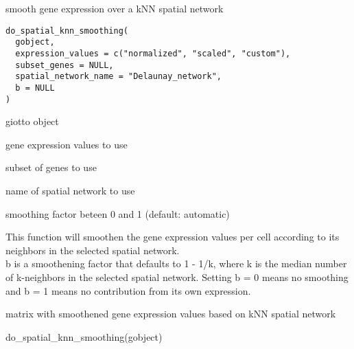 \documentclass[a4paper]{book}
\begin{document}
%
\begin{Description}\relax
smooth gene expression over a kNN spatial network
\end{Description}
%
\begin{Usage}
\begin{verbatim}
do_spatial_knn_smoothing(
  gobject,
  expression_values = c("normalized", "scaled", "custom"),
  subset_genes = NULL,
  spatial_network_name = "Delaunay_network",
  b = NULL
)
\end{verbatim}
\end{Usage}
%
\begin{Arguments}
\begin{ldescription}
\item[\code{gobject}] giotto object

\item[\code{expression\_values}] gene expression values to use

\item[\code{subset\_genes}] subset of genes to use

\item[\code{spatial\_network\_name}] name of spatial network to use

\item[\code{b}] smoothing factor beteen 0 and 1 (default: automatic)
\end{ldescription}
\end{Arguments}
%
\begin{Details}\relax
This function will smoothen the gene expression values per cell according to
its neighbors in the selected spatial network. \\{}
b is a smoothening factor that defaults to 1 - 1/k, where k is the median number of
k-neighbors in the selected spatial network. Setting b = 0 means no smoothing and b = 1
means no contribution from its own expression.
\end{Details}
%
\begin{Value}
matrix with smoothened gene expression values based on kNN spatial network
\end{Value}
%
\begin{Examples}
\begin{ExampleCode}
    do_spatial_knn_smoothing(gobject)
\end{ExampleCode}
\end{Examples}
\end{document}
